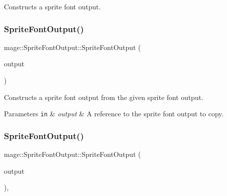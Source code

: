 Constructs a sprite font output. \hypertarget{structmage_1_1_sprite_font_output_a02ea4f9574bce22b4f0f32b78b6b3b79}{}\label{structmage_1_1_sprite_font_output_a02ea4f9574bce22b4f0f32b78b6b3b79} 
\subsubsection{\texorpdfstring{Sprite\+Font\+Output()}{SpriteFontOutput()}\hspace{0.1cm}{\footnotesize\ttfamily [2/3]}}
{\footnotesize\ttfamily mage\+::\+Sprite\+Font\+Output\+::\+Sprite\+Font\+Output (\begin{DoxyParamCaption}\item[{const \hyperlink{structmage_1_1_sprite_font_output}{Sprite\+Font\+Output} \&}]{output }\end{DoxyParamCaption})\hspace{0.3cm}{\ttfamily [delete]}}

Constructs a sprite font output from the given sprite font output.


\begin{DoxyParams}[1]{Parameters}
\mbox{\tt in}  & {\em output} & A reference to the sprite font output to copy. \\
\hline
\end{DoxyParams}
\hypertarget{structmage_1_1_sprite_font_output_aed4a4a96c9c767060710cb259d7fa2e9}{}\label{structmage_1_1_sprite_font_output_aed4a4a96c9c767060710cb259d7fa2e9} 
\subsubsection{\texorpdfstring{Sprite\+Font\+Output()}{SpriteFontOutput()}\hspace{0.1cm}{\footnotesize\ttfamily [3/3]}}
{\footnotesize\ttfamily mage\+::\+Sprite\+Font\+Output\+::\+Sprite\+Font\+Output (\begin{DoxyParamCaption}\item[{\hyperlink{structmage_1_1_sprite_font_output}{Sprite\+Font\+Output} \&\&}]{output }\end{DoxyParamCaption})\hspace{0.3cm}{\ttfamily [default]}, {\ttfamily [noexcept]}}

